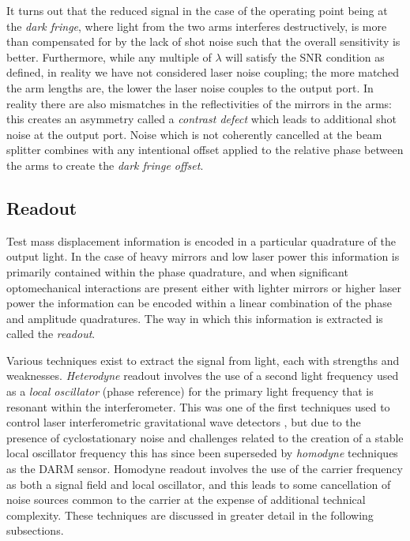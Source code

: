 It turns out that the reduced signal in the case of the operating point being at the \emph{dark fringe}, where light from the two arms interferes destructively, is more than compensated for by the lack of shot noise such that the overall sensitivity is better. Furthermore, while any multiple of $\lambda$ will satisfy the \gls{SNR} condition as defined, in reality we have not considered laser noise coupling; the more matched the arm lengths are, the lower the laser noise couples to the output port. In reality there are also mismatches in the reflectivities of the mirrors in the arms: this creates an asymmetry called a \emph{contrast defect} which leads to additional shot noise at the output port. Noise which is not coherently cancelled at the beam splitter combines with any intentional offset applied to the relative phase between the arms to create the \emph{dark fringe offset}.

\subsection{\label{sec:readout}Readout}

Test mass displacement information is encoded in a particular quadrature of the output light. In the case of heavy mirrors and low laser power this information is primarily contained within the phase quadrature, and when significant optomechanical interactions are present either with lighter mirrors or higher laser power the information can be encoded within a linear combination of the phase and amplitude quadratures. The way in which this information is extracted is called the \emph{readout}.

Various techniques exist to extract the signal from light, each with strengths and weaknesses. \emph{Heterodyne} readout involves the use of a second light frequency used as a \emph{local oscillator} (phase reference) for the primary light frequency that is resonant within the interferometer. This was one of the first techniques used to control laser interferometric gravitational wave detectors \cite{Willke2002}, but due to the presence of cyclostationary noise \cite{Niebauer1991} and challenges related to the creation of a stable local oscillator frequency this has since been superseded by \emph{homodyne} techniques as the \gls{DARM} sensor. Homodyne readout involves the use of the carrier frequency as both a signal field and local oscillator, and this leads to some cancellation of noise sources common to the carrier at the expense of additional technical complexity. These techniques are discussed in greater detail in the following subsections.

